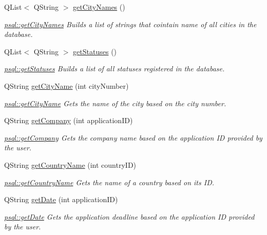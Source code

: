 \begin{DoxyCompactItemize}
\item 
Q\+List$<$ Q\+String $>$ \hyperlink{classpsql_a42ee0cf90055ba6a7a6f564cf04d8bb8}{get\+City\+Names} ()
\begin{DoxyCompactList}\small\item\em \hyperlink{classpsql_a42ee0cf90055ba6a7a6f564cf04d8bb8}{psql\+::get\+City\+Names} Builds a list of strings that cointain name of all cities in the database. \end{DoxyCompactList}\item 
Q\+List$<$ Q\+String $>$ \hyperlink{classpsql_a14854d28aabc7e658aea87a7b8b52e5c}{get\+Statuses} ()
\begin{DoxyCompactList}\small\item\em \hyperlink{classpsql_a14854d28aabc7e658aea87a7b8b52e5c}{psql\+::get\+Statuses} Builds a list of all statuses registered in the database. \end{DoxyCompactList}\item 
Q\+String \hyperlink{classpsql_a7acc18034ef60c8a1e69b0e1a15d8ab2}{get\+City\+Name} (int city\+Number)
\begin{DoxyCompactList}\small\item\em \hyperlink{classpsql_a7acc18034ef60c8a1e69b0e1a15d8ab2}{psql\+::get\+City\+Name} Gets the name of the city based on the city number. \end{DoxyCompactList}\item 
Q\+String \hyperlink{classpsql_a09745cd03f09ffb2dacacaab4281915f}{get\+Company} (int application\+ID)
\begin{DoxyCompactList}\small\item\em \hyperlink{classpsql_a09745cd03f09ffb2dacacaab4281915f}{psql\+::get\+Company} Gets the company name based on the application ID provided by the user. \end{DoxyCompactList}\item 
Q\+String \hyperlink{classpsql_a5724e9992e6a5c98524ab73b98f4202d}{get\+Country\+Name} (int country\+ID)
\begin{DoxyCompactList}\small\item\em \hyperlink{classpsql_a5724e9992e6a5c98524ab73b98f4202d}{psql\+::get\+Country\+Name} Gets the name of a country based on its ID. \end{DoxyCompactList}\item 
Q\+String \hyperlink{classpsql_a561f96bfe7e9d092077712dd6b186af8}{get\+Date} (int application\+ID)
\begin{DoxyCompactList}\small\item\em \hyperlink{classpsql_a561f96bfe7e9d092077712dd6b186af8}{psql\+::get\+Date} Gets the application deadline based on the application ID provided by the user. \end{DoxyCompactList}\item 

\end{DoxyCompactItemize}
